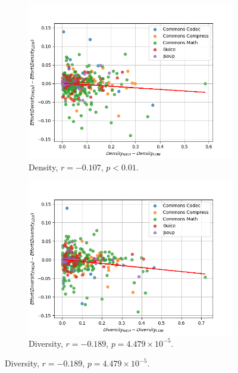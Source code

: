 \documentclass[twoside,a4paper,11pt]{memoir}
\begin{document}
\begin{figure}
    \centering
    \begin{subfigure}[b]{0.49\linewidth}
        \centering
        \includegraphics[width=\linewidth]{figures/delta_effort_density}
        \caption{Density, \(r=-0.107 \), \(p<0.01 \).}%
        \label{fig:delta_effort_density}
    \end{subfigure}
    \hfill
    \begin{subfigure}[b]{0.49\linewidth}
        \centering
        \includegraphics[width=\linewidth]{figures/delta_effort_diversity}
        \caption{Diversity, \(r=-0.189 \), \(p = 4.479\times10^{-5} \).}%
        \label{fig:delta_effort_diversity}
    \end{subfigure}

\end{figure}
\end{document}
